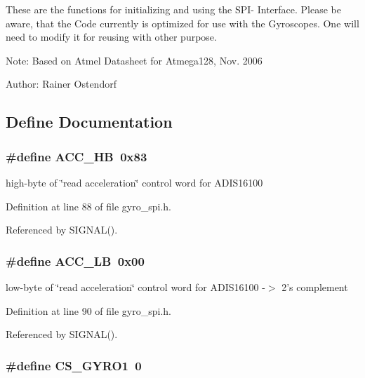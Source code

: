 These are the functions for initializing and using the SPI- Interface. Please be aware, that the Code currently is optimized for use with the Gyroscopes. One will need to modify it for reusing with other purpose.

\begin{Desc}
\item[Note:]Based on Atmel Datasheet for Atmega128, Nov. 2006 \end{Desc}
\begin{Desc}
\item[Author:]Rainer Ostendorf \end{Desc}


\subsection{Define Documentation}
\subsubsection{\setlength{\rightskip}{0pt plus 5cm}\#define ACC\_\-HB~0x83}\label{group__ro__spi_g28fde31f8a9dafcccf610c96caeccdf5}


high-byte of \char`\"{}read acceleration\char`\"{} control word for ADIS16100 

Definition at line 88 of file gyro\_\-spi.h.

Referenced by SIGNAL().
\subsubsection{\setlength{\rightskip}{0pt plus 5cm}\#define ACC\_\-LB~0x00}\label{group__ro__spi_gb89f1a4d552ccdd144354452b34f0897}


low-byte of \char`\"{}read acceleration\char`\"{} control word for ADIS16100 -$>$ 2's complement 

Definition at line 90 of file gyro\_\-spi.h.

Referenced by SIGNAL().
\subsubsection{\setlength{\rightskip}{0pt plus 5cm}\#define CS\_\-GYRO1~0}\label{group__ro__spi_ge9c334b89c28b7c73b19a1f57f67e801}


